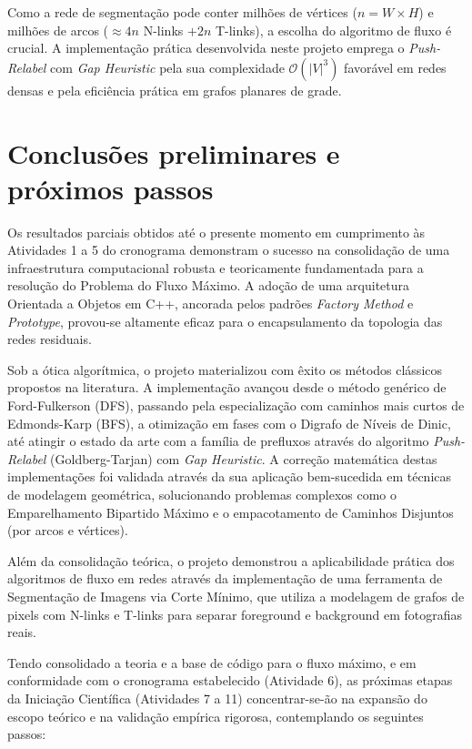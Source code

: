 \documentclass[12pt,a4paper]{article}
\begin{document}
Como a rede de segmentação pode conter milhões de vértices ($n = W \times H$) e milhões de arcos ($\approx 4n$ N-links $+ 2n$ T-links), a escolha do algoritmo de fluxo é crucial. A implementação prática desenvolvida neste projeto emprega o \textit{Push-Relabel} com \textit{Gap Heuristic} pela sua complexidade $\mathcal{O}(|V|^3)$ favorável em redes densas e pela eficiência prática em grafos planares de grade.

\section{Conclusões preliminares e próximos passos}

Os resultados parciais obtidos até o presente momento em cumprimento às Atividades 1 a 5 do cronograma demonstram o sucesso na consolidação de uma infraestrutura computacional robusta e teoricamente fundamentada para a resolução do Problema do Fluxo Máximo. A adoção de uma arquitetura Orientada a Objetos em C++, ancorada pelos padrões \textit{Factory Method} e \textit{Prototype}, provou-se altamente eficaz para o encapsulamento da topologia das redes residuais.

Sob a ótica algorítmica, o projeto materializou com êxito os métodos clássicos propostos na literatura. A implementação avançou desde o método genérico de Ford-Fulkerson (DFS), passando pela especialização com caminhos mais curtos de Edmonds-Karp (BFS), a otimização em fases com o Digrafo de Níveis de Dinic, até atingir o estado da arte com a família de prefluxos através do algoritmo \textit{Push-Relabel} (Goldberg-Tarjan) com \textit{Gap Heuristic}. A correção matemática destas implementações foi validada através da sua aplicação bem-sucedida em técnicas de modelagem geométrica, solucionando problemas complexos como o Emparelhamento Bipartido Máximo e o empacotamento de Caminhos Disjuntos (por arcos e vértices).

Além da consolidação teórica, o projeto demonstrou a aplicabilidade prática dos algoritmos de fluxo em redes através da implementação de uma ferramenta de Segmentação de Imagens via Corte Mínimo, que utiliza a modelagem de grafos de pixels com N-links e T-links para separar foreground e background em fotografias reais.

Tendo consolidado a teoria e a base de código para o fluxo máximo, e em conformidade com o cronograma estabelecido (Atividade 6), as próximas etapas da Iniciação Científica (Atividades 7 a 11) concentrar-se-ão na expansão do escopo teórico e na validação empírica rigorosa, contemplando os seguintes passos:
\end{document}
